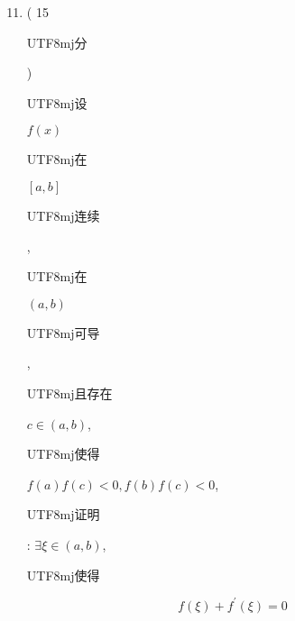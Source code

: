 \documentclass[10pt]{article}
\begin{document}
\begin{enumerate}
  \setcounter{enumi}{10}
  \item ( 15 \begin{CJK}{UTF8}{mj}分\end{CJK}) \begin{CJK}{UTF8}{mj}设\end{CJK} $f(x)$ \begin{CJK}{UTF8}{mj}在\end{CJK} $[a, b]$ \begin{CJK}{UTF8}{mj}连续\end{CJK}, \begin{CJK}{UTF8}{mj}在\end{CJK} $(a, b)$ \begin{CJK}{UTF8}{mj}可导\end{CJK}, \begin{CJK}{UTF8}{mj}且存在\end{CJK} $c \in(a, b)$, \begin{CJK}{UTF8}{mj}使得\end{CJK} $f(a) f(c)<0, f(b) f(c)<0$, \begin{CJK}{UTF8}{mj}证明\end{CJK}: $\exists \xi \in(a, b)$, \begin{CJK}{UTF8}{mj}使得\end{CJK}
\end{enumerate}
$$
f(\xi)+f^{\prime}(\xi)=0
$$
\end{document}
